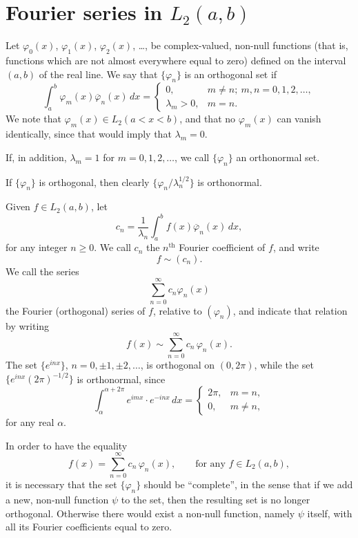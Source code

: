\section{Fourier series in \texorpdfstring{$L_2(a,b)$}{L2(a,b)}}
\label{sec:II-8}

\noindent Let $\varphi_{0}(x)$, $\varphi_{1}(x)$, $\varphi_{2}(x)$, \dots, be complex-valued, non-null functions (that is, functions which are not almost everywhere equal to zero) defined on the interval $(a,b)$ of the real line. We say that $\{\varphi_{n}\}$ is an orthogonal set if
\[
\int_{a}^{b}\varphi_{m}(x)\overline{\varphi}_{n}(x)\,dx=
\begin{cases}
0, & m\neq n;\ m,n=0,1,2,\dots,\\
\lambda_{m}>0, & m=n.
\end{cases}
\]
We note that $\varphi_{m}(x)\in L_{2}(a<x<b)$, and that no $\varphi_{m}(x)$ can vanish identically, since that would imply that $\lambda_{m}=0$.

If, in addition, $\lambda_{m}=1$ for $m=0,1,2,\dots$, we call $\{\varphi_{n}\}$ an orthonormal set.

If $\{\varphi_{n}\}$ is orthogonal, then clearly $\{\varphi_{n}/\lambda_{n}^{1/2}\}$ is orthonormal.

Given $f\in L_{2}(a,b)$, let
\[
c_{n}=\frac{1}{\lambda_{n}}\int_{a}^{b}f(x)\overline{\varphi}_{n}(x)\,dx,
\]
for any integer $n\ge 0$. We call $c_{n}$ the $n^{\text{th}}$ Fourier coefficient of $f$, and write
\begin{equation}\tag{8.1}\label{eq:II-8.1}
f\sim(c_{n}).
\end{equation}
We call the series
\[
\sum_{n=0}^{\infty}c_{n}\varphi_{n}(x)
\]
the Fourier (orthogonal) series of $f$, relative to $(\varphi_{n})$, and indicate that relation by writing
\begin{equation}\tag{8.2}\label{eq:II-8.2}
f(x)\sim\sum_{n=0}^{\infty}c_{n}\,\varphi_{n}(x).
\end{equation}
The set $\{e^{inx}\}$, $n=0,\pm1,\pm2,\dots$, is orthogonal on $(0,2\pi)$, while the set $\{e^{inx}(2\pi)^{-1/2}\}$ is orthonormal, since
\[
\int_{\alpha}^{\alpha+2\pi}e^{imx}\cdot e^{-inx}\,dx=
\begin{cases}
2\pi, & m=n,\\
0, & m\neq n,
\end{cases}
\]
for any real $\alpha$.

In order to have the equality
\[
f(x)=\sum_{n=0}^{\infty}c_{n}\,\varphi_{n}(x),\qquad\text{for any }f\in L_{2}(a,b),
\]
it is necessary that the set $\{\varphi_{n}\}$ should be ``complete'', in the sense that if we add a new, non-null function $\psi$ to the set, then the resulting set is no longer orthogonal. Otherwise there would exist a non-null function, namely $\psi$ itself, with all its Fourier coefficients equal to zero.

